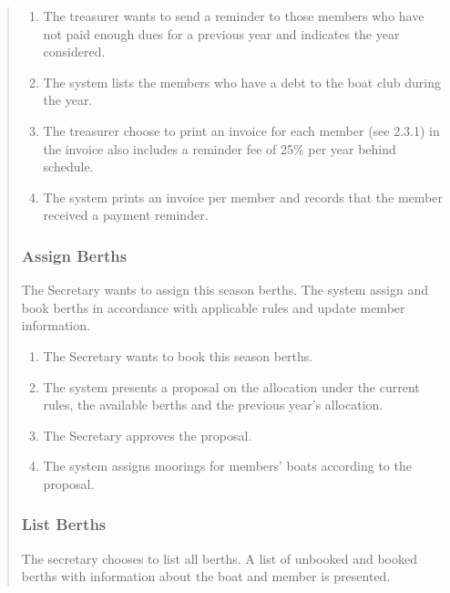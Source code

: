 \begin{quote}
\begin{enumerate}
  \tightlist
  \item
    The treasurer wants to send a reminder to those members who have not
    paid enough dues for a previous year and indicates the year
    considered.
  \item
    The system lists the members who have a debt to the boat club during
    the year.
  \item
    The treasurer choose to print an invoice for each member (see 2.3.1)
    in the invoice also includes a reminder fee of 25\% per year behind
    schedule.
  \item
    The system prints an invoice per member and records that the member
    received a payment reminder.
\end{enumerate}


\subsubsection{Assign Berths}\label{usecase8}

The Secretary wants to assign this season berths. The system assign and
book berths in accordance with applicable rules and update member
information.

\begin{enumerate}
  \tightlist
  \item
    The Secretary wants to book this season berths.
  \item
    The system presents a proposal on the allocation under the current
    rules, the available berths and the previous year's allocation.
  \item
    The Secretary approves the proposal.
  \item
    The system assigns moorings for members' boats according to the
    proposal.
\end{enumerate}


\subsubsection{List Berths}\label{usecase9}

The secretary chooses to list all berths. A list of unbooked and booked
berths with information about the boat and member is presented.



\end{quote}
